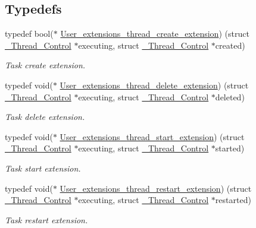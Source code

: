 \subsection*{Typedefs}
\begin{DoxyCompactItemize}
\item 
typedef bool($\ast$ \mbox{\hyperlink{group__RTEMSScoreUserExt_gaa1841550f1837f2119ce895ad1b06861}{User\+\_\+extensions\+\_\+thread\+\_\+create\+\_\+extension}}) (struct \mbox{\hyperlink{struct__Thread__Control}{\+\_\+\+Thread\+\_\+\+Control}} $\ast$executing, struct \mbox{\hyperlink{struct__Thread__Control}{\+\_\+\+Thread\+\_\+\+Control}} $\ast$created)
\begin{DoxyCompactList}\small\item\em Task create extension. \end{DoxyCompactList}\item 
typedef void($\ast$ \mbox{\hyperlink{group__RTEMSScoreUserExt_gac18e876b733325cf488b33a4a1c94558}{User\+\_\+extensions\+\_\+thread\+\_\+delete\+\_\+extension}}) (struct \mbox{\hyperlink{struct__Thread__Control}{\+\_\+\+Thread\+\_\+\+Control}} $\ast$executing, struct \mbox{\hyperlink{struct__Thread__Control}{\+\_\+\+Thread\+\_\+\+Control}} $\ast$deleted)
\begin{DoxyCompactList}\small\item\em Task delete extension. \end{DoxyCompactList}\item 
typedef void($\ast$ \mbox{\hyperlink{group__RTEMSScoreUserExt_ga4924b5a161503c73ac1c894561fdd2b5}{User\+\_\+extensions\+\_\+thread\+\_\+start\+\_\+extension}}) (struct \mbox{\hyperlink{struct__Thread__Control}{\+\_\+\+Thread\+\_\+\+Control}} $\ast$executing, struct \mbox{\hyperlink{struct__Thread__Control}{\+\_\+\+Thread\+\_\+\+Control}} $\ast$started)
\begin{DoxyCompactList}\small\item\em Task start extension. \end{DoxyCompactList}\item 
typedef void($\ast$ \mbox{\hyperlink{group__RTEMSScoreUserExt_ga2f53589bea8c67fd0f1fef2d2115479c}{User\+\_\+extensions\+\_\+thread\+\_\+restart\+\_\+extension}}) (struct \mbox{\hyperlink{struct__Thread__Control}{\+\_\+\+Thread\+\_\+\+Control}} $\ast$executing, struct \mbox{\hyperlink{struct__Thread__Control}{\+\_\+\+Thread\+\_\+\+Control}} $\ast$restarted)
\begin{DoxyCompactList}\small\item\em Task restart extension. \end{DoxyCompactList}\item 

\end{DoxyCompactItemize}
